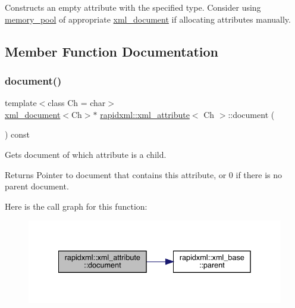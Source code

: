 Constructs an empty attribute with the specified type. Consider using \mbox{\hyperlink{classrapidxml_1_1memory__pool}{memory\+\_\+pool}} of appropriate \mbox{\hyperlink{classrapidxml_1_1xml__document}{xml\+\_\+document}} if allocating attributes manually. 

\subsection{Member Function Documentation}
\mbox{\label{classrapidxml_1_1xml__attribute_ab0ff3bc7880a6969ddcf0bb1e0444077}} 
\subsubsection{\texorpdfstring{document()}{document()}}
{\footnotesize\ttfamily template$<$class Ch = char$>$ \\
\mbox{\hyperlink{classrapidxml_1_1xml__document}{xml\+\_\+document}}$<$Ch$>$$\ast$ \mbox{\hyperlink{classrapidxml_1_1xml__attribute}{rapidxml\+::xml\+\_\+attribute}}$<$ Ch $>$\+::document (\begin{DoxyParamCaption}{ }\end{DoxyParamCaption}) const\hspace{0.3cm}{\ttfamily [inline]}}

Gets document of which attribute is a child. \begin{DoxyReturn}{Returns}
Pointer to document that contains this attribute, or 0 if there is no parent document. 
\end{DoxyReturn}
Here is the call graph for this function\+:\nopagebreak
\begin{figure}[H]
\begin{center}
\leavevmode
\includegraphics[width=335pt]{classrapidxml_1_1xml__attribute_ab0ff3bc7880a6969ddcf0bb1e0444077_cgraph}
\end{center}
\end{figure}
\mbox{\label{classrapidxml_1_1xml__attribute_affd0c8d0a9020df0998c507cae5474e5}} 
